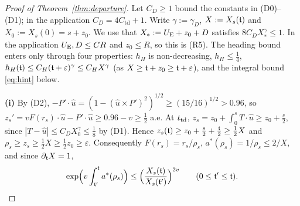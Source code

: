 \begin{proof}[Proof of Theorem~\ref{thm:departure}]
Let $C_D\ge1$ bound the constants in (D0)--(D1); in the application $C_D=4C_{\mathrm{td}}+1$. Write $\gamma:=\gamma_D$,
$X:=X_s(\mathfrak{t})$ and $X_0:=X_s(0)=s+z_0$. We use that $X_*:=U_{\mathrm{E}}+z_0+D$ satisfies $8C_DX_*^{\gamma}\le1$. In the
application $U_{\mathrm{E}},D\le CR$ and $z_0\le R$, so this is (R5). The heading bound enters only through four properties:
$h_H$ is non-decreasing, $h_H\le\frac14$, $h_H(\mathfrak{t})\le C_H(\mathfrak{t}+\varepsilon)^\gamma\le C_HX^\gamma$ (as
$X\ge\mathfrak{t}+z_0\ge\mathfrak{t}+\varepsilon$), and the integral bound \eqref{eq:hint} below.

\textbf{(i)} By (D2), $-P'\cdot\hat u=(1-(\hat u\times P')^2)^{1/2}\ge(15/16)^{1/2}>0.96$, so
$z_s'=vF(r_s)\cdot\hat u-P'\cdot\hat u\ge0.96-v\ge\frac12$ a.e. At $t_{\mathrm{td}}$,
$z_s=z_0+\int_0^sT\cdot\hat u\ge z_0+\frac s2$, since $|T-\hat u|\le C_DX_0^\gamma\le\frac18$ by (D1). Hence
$z_s(\mathfrak{t})\ge z_0+\frac s2+\frac{\mathfrak{t}}2\ge\frac12X$ and $\rho_s\ge z_s\ge\frac12X\ge\frac12z_0\ge\varepsilon$.
Consequently $F(r_s)=r_s/\rho_s$, $a^*(\rho_s)=1/\rho_s\le2/X$, and since $\partial_{\mathfrak{t}} X=1$,
\begin{equation}\label{eq:depamp}
\exp\Bigl(v\int_{\mathfrak{t}'}^{\mathfrak{t}}a^*(\rho_s)\Bigr)\le\Bigl(\frac{X_s(\mathfrak{t})}{X_s(\mathfrak{t}')}\Bigr)^{2v}\qquad(0\le\mathfrak{t}'\le\mathfrak{t}).
\end{equation}


\end{proof}
